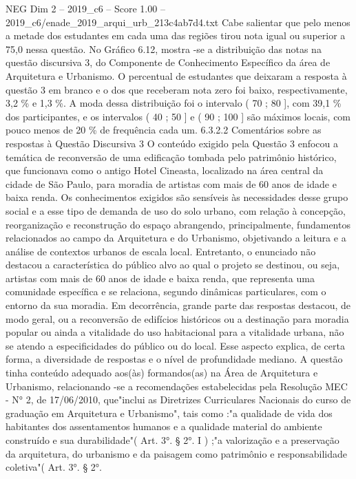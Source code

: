 \begin{textsample}{NEG Dim 2 – 2019\_c6 – Score 1.00 – 2019\_c6/enade\_2019\_arqui\_urb\_213c4ab7d4.txt}
Cabe salientar que pelo menos a metade dos estudantes em cada uma das regiões tirou nota igual ou superior a 75,0 nessa questão.
No Gráfico 6.12, mostra -se a distribuição das notas na questão discursiva 3, do Componente de Conhecimento Específico da área de Arquitetura e Urbanismo.
O percentual de estudantes que deixaram a resposta à questão 3 em branco e o dos que receberam nota zero foi baixo, respectivamente, 3,2 \% e 1,3 \%.
A moda dessa distribuição foi o intervalo ( 70 ; 80 ], com 39,1 \% dos participantes, e os intervalos ( 40 ; 50 ] e ( 90 ; 100 ] são máximos locais, com pouco menos de 20 \% de frequência cada um. 6.3.2.2 Comentários sobre as respostas à Questão Discursiva 3 O conteúdo exigido pela Questão 3 enfocou a temática de reconversão de uma edificação tombada pelo patrimônio histórico, que funcionava como o antigo Hotel Cineasta, localizado na área central da cidade de São Paulo, para moradia de artistas com mais de 60 anos de idade e baixa renda.
Os conhecimentos exigidos são sensíveis às necessidades desse grupo social e a esse tipo de demanda de uso do solo urbano, com relação à concepção, reorganização e reconstrução do espaço abrangendo, principalmente, fundamentos relacionados ao campo da Arquitetura e do Urbanismo, objetivando a leitura e a análise de contextos urbanos de escala local.
Entretanto, o enunciado não destacou a característica do público alvo ao qual o projeto se destinou, ou seja, artistas com mais de 60 anos de idade e baixa renda, que representa uma comunidade específica e se relaciona, segundo dinâmicas particulares, com o entorno da sua moradia.
Em decorrência, grande parte das respostas destacou, de modo geral, ou a reconversão de edifícios históricos ou a destinação para moradia popular ou ainda a vitalidade do uso habitacional para a vitalidade urbana, não se atendo a especificidades do público ou do local.
Esse aspecto explica, de certa forma, a diversidade de respostas e o nível de profundidade mediano.
A questão tinha conteúdo adequado aos(às) formandos(as) na Área de Arquitetura e Urbanismo, relacionando -se a recomendações estabelecidas pela Resolução MEC - N{\EmojiFont °} 2, de 17/06/2010, que"inclui as Diretrizes Curriculares Nacionais do curso de graduação em Arquitetura e Urbanismo", tais como :"a qualidade de vida dos habitantes dos assentamentos humanos e a qualidade material do ambiente construído e sua durabilidade"( Art. 3{\EmojiFont °}. § 2{\EmojiFont °}.
I ) ;"a valorização e a preservação da arquitetura, do urbanismo e da paisagem como patrimônio e responsabilidade coletiva"( Art. 3{\EmojiFont °}. § 2{\EmojiFont °}.

\end{textsample}
